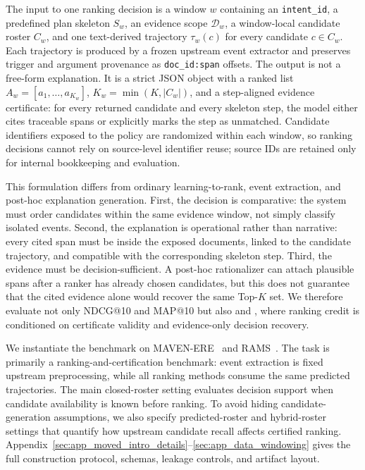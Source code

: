 \documentclass{article}
\begin{document}
The input to one ranking decision is a window $w$ containing an \texttt{intent\_id}, a predefined plan skeleton $S_w$, an evidence scope $\mathcal{D}_w$, a window-local candidate roster $C_w$, and one text-derived trajectory $\tau_w(c)$ for every candidate $c\in C_w$. Each trajectory is produced by a frozen upstream event extractor and preserves trigger and argument provenance as \texttt{doc\_id:span} offsets. The output is not a free-form explanation. It is a strict JSON object with a ranked list $A_w=[a_1,\ldots,a_{K_w}]$, $K_w=\min(K,|C_w|)$, and a step-aligned evidence certificate: for every returned candidate and every skeleton step, the model either cites traceable spans or explicitly marks the step as unmatched. Candidate identifiers exposed to the policy are randomized within each window, so ranking decisions cannot rely on source-level identifier reuse; source IDs are retained only for internal bookkeeping and evaluation.

This formulation differs from ordinary learning-to-rank, event extraction, and post-hoc explanation generation. First, the decision is comparative: the system must order candidates within the same evidence window, not simply classify isolated events. Second, the explanation is operational rather than narrative: every cited span must be inside the exposed documents, linked to the candidate trajectory, and compatible with the corresponding skeleton step. Third, the evidence must be decision-sufficient. A post-hoc rationalizer can attach plausible spans after a ranker has already chosen candidates, but this does not guarantee that the cited evidence alone would recover the same Top-$K$ set. We therefore evaluate not only NDCG@10 and MAP@10 but also  and , where ranking credit is conditioned on certificate validity and evidence-only decision recovery.

We instantiate the benchmark on MAVEN-ERE~\citep{wang_maven-ere_2022} and RAMS~\citep{ebner_multi-sentence_2020}. The task is primarily a ranking-and-certification benchmark: event extraction is fixed upstream preprocessing, while all ranking methods consume the same predicted trajectories. The main closed-roster setting evaluates decision support when candidate availability is known before ranking. To avoid hiding candidate-generation assumptions, we also specify predicted-roster and hybrid-roster settings that quantify how upstream candidate recall affects certified ranking. Appendix~\ref{sec:app_moved_intro_details}--\ref{sec:app_data_windowing} gives the full construction protocol, schemas, leakage controls, and artifact layout.
\end{document}
